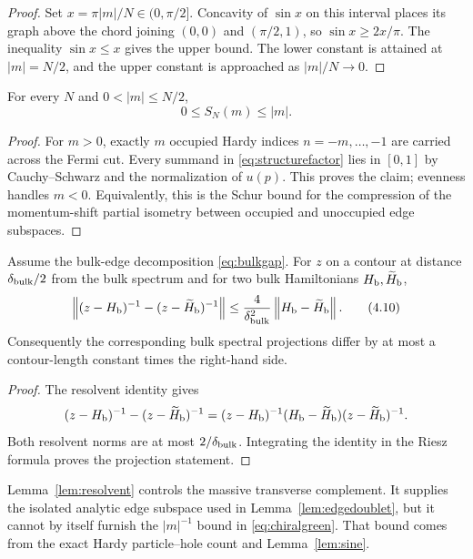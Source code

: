 \begin{proof}
Set $x=\pi|m|/N\in(0,\pi/2]$.  Concavity of $\sin x$ on this interval
places its graph above the chord joining $(0,0)$ and $(\pi/2,1)$, so
$\sin x\ge2x/\pi$.  The inequality $\sin x\le x$ gives the upper bound.
The lower constant is attained at $|m|=N/2$, and the upper constant is
approached as $|m|/N\to0$.
\end{proof}

\begin{lemma}\label{lem:Schur}
For every $N$ and $0<|m|\le N/2$,
\[
 0\le S_N(m)\le |m|.
\tag{4.9}\label{eq:Schur}
\]
\end{lemma}

\begin{proof}
For $m>0$, exactly $m$ occupied Hardy indices
$n=-m,\ldots,-1$ are carried across the Fermi cut.  Every summand in
\eqref{eq:structurefactor} lies in $[0,1]$ by Cauchy--Schwarz and the
normalization of $u(p)$.  This proves the claim; evenness handles
$m<0$.  Equivalently, this is the Schur bound for the compression of the
momentum-shift partial isometry between occupied and unoccupied edge
subspaces.
\end{proof}

\begin{lemma}\label{lem:resolvent}
Assume the bulk-edge decomposition \eqref{eq:bulkgap}.  For
$z$ on a contour at distance $\delta_{\rm bulk}/2$ from the bulk
spectrum and for two bulk Hamiltonians $H_{\rm b},\widetilde H_{\rm b}$,
\[
 \left\lVert(z-H_{\rm b})^{-1}-(z-\widetilde H_{\rm b})^{-1}\right\rVert
 \le\frac{4}{\delta_{\rm bulk}^2}
       \left\lVert H_{\rm b}-\widetilde H_{\rm b}\right\rVert.
\tag{4.10}\label{eq:resolventidentity}
\]
Consequently the corresponding bulk spectral projections differ by at
most a contour-length constant times the right-hand side.
\end{lemma}

\begin{proof}
The resolvent identity gives
\[
 (z-H_{\rm b})^{-1}-(z-\widetilde H_{\rm b})^{-1}
 =(z-H_{\rm b})^{-1}(H_{\rm b}-\widetilde H_{\rm b})
   (z-\widetilde H_{\rm b})^{-1}.
\]
Both resolvent norms are at most $2/\delta_{\rm bulk}$.  Integrating the
identity in the Riesz formula proves the projection statement.
\end{proof}

\begin{remark}
Lemma~\ref{lem:resolvent} controls the massive transverse complement.
It supplies the isolated analytic edge subspace used in
Lemma~\ref{lem:edgedoublet}, but it cannot by itself furnish the
$|m|^{-1}$ bound in \eqref{eq:chiralgreen}.  That bound comes from the
exact Hardy particle--hole count and Lemma~\ref{lem:sine}.
\end{remark}


